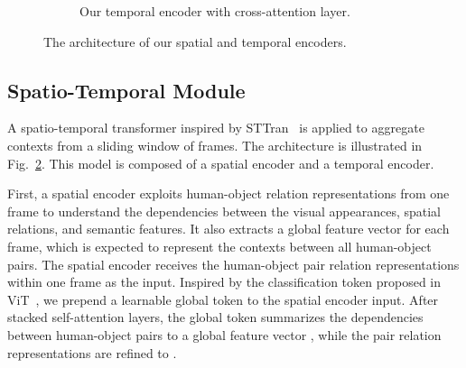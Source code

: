 \documentclass[times,twocolumn,final,authoryear]{elsarticle}
\begin{document}
\begin{figure}
\begin{subfigure}[b]{0.26\textwidth}
        \caption{Our temporal encoder with cross-attention layer. }
        \label{fig:cross_encoder}
    \end{subfigure}
    \caption{The architecture of our spatial and temporal encoders.}
    \label{fig:encoder}
\end{figure}

\subsection{Spatio-Temporal Module}
A spatio-temporal transformer inspired by STTran~\citep{hoi_v2:sttran} is applied to aggregate contexts from a sliding window of frames. The architecture is illustrated in Fig.~\ref{fig:encoder}. This model is composed of a spatial encoder and a temporal encoder.

First, a spatial encoder exploits human-object relation representations from one frame to understand the dependencies between the visual appearances, spatial relations, and semantic features. It also extracts a global feature vector for each frame, which is expected to represent the contexts between all human-object pairs. The spatial encoder receives the human-object pair relation representations  within one frame as the input. Inspired by the classification token proposed in ViT~\citep{transformer:vit}, we prepend a learnable global token to the spatial encoder input. After  stacked self-attention layers, the global token summarizes the dependencies between human-object pairs to a global feature vector , while the pair relation representations are refined to .
\end{document}
